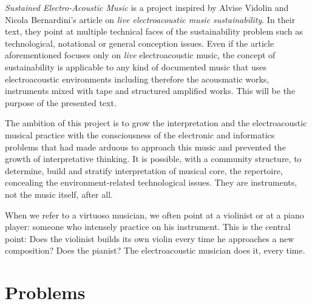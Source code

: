 \documentclass[twoside,a4paper]{article}
\begin{document}
\emph{Sustained Electro-Acoustic Music} is a project inspired by Alvise Vidolin and Nicola Bernardini's article \cite{bevi05} on \emph{live electroacoustic music sustainability}. In their text, they point at multiple technical faces of the sustainability problem such as technological, notational or general conception issues. Even if the article aforementioned focuses only on \emph{live} electroacoustic music, the concept of sustainability is applicable to any kind of documented music that uses electroacoustic environments including therefore the acousmatic works, instruments mixed with tape and structured amplified works. This will be the purpose of the presented text.

The ambition of this project is to grow the interpretation and the electroacoustic musical practice with the consciousness of the electronic and informatics problems that had made arduous to approach this music and prevented the growth of interpretative thinking. It is possible, with a community structure, to determine, build and stratify interpretation of musical core, the repertoire, concealing the environment-related technological issues. They are instruments, not the music itself, after all.

When we refer to a virtuoso musician, we often point at a violinist or at a piano player: someone who intensely practice on his instrument. This is the central point: Does the violinist builds its own violin every time he approaches a new composition? Does the pianist? The electroacoustic musician does it, every time.



\section{Problems}
\label{sec:problems}
\end{document}
